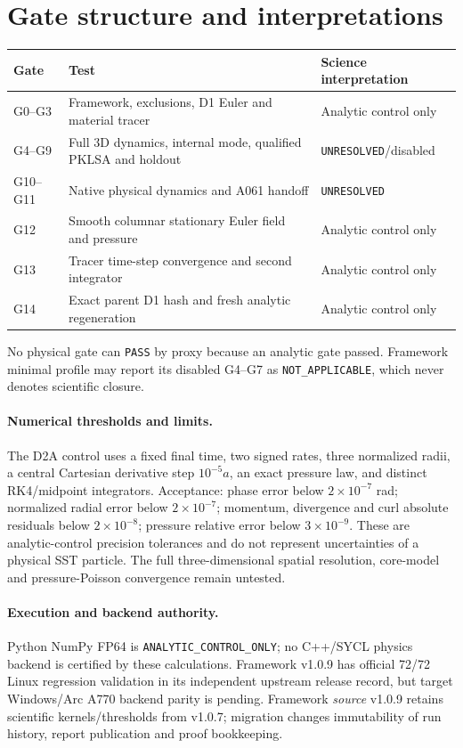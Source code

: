 \documentclass[10pt,a4paper]{article}
\newcommand{\unresolved}{\texttt{UNRESOLVED}}
\begin{document}
\section{Gate structure and interpretations}
\begin{longtable}{p{.10\linewidth}p{.66\linewidth}p{.17\linewidth}}
\toprule Gate & Test & Science interpretation\\\midrule
G0--G3 & Framework, exclusions, D1 Euler and material tracer & Analytic control only\\
G4--G9 & Full 3D dynamics, internal mode, qualified PKLSA and holdout & \unresolved/disabled\\
G10--G11 & Native physical dynamics and A061 handoff & \unresolved\\
G12 & Smooth columnar stationary Euler field and pressure & Analytic control only\\
G13 & Tracer time-step convergence and second integrator & Analytic control only\\
G14 & Exact parent D1 hash and fresh analytic regeneration & Analytic control only\\\bottomrule
\end{longtable}
No physical gate can \texttt{PASS} by proxy because an analytic gate passed.
Framework minimal profile may report its disabled G4--G7 as
\texttt{NOT\_APPLICABLE}, which never denotes scientific closure.
\paragraph{Numerical thresholds and limits.}
The D2A control uses a fixed final time, two signed rates, three normalized
radii, a central Cartesian derivative step $10^{-5}a$, an exact pressure law,
and distinct RK4/midpoint integrators. Acceptance: phase error below $2\times10^{-7}$
rad; normalized radial error below $2\times10^{-7}$; momentum, divergence and
curl absolute residuals below $2\times 10^{-8}$; pressure relative error below
$3\times10^{-9}$. These are analytic-control precision tolerances and do not
represent uncertainties of a physical SST particle. The full three-dimensional
spatial resolution, core-model and pressure-Poisson convergence remain untested.
\paragraph{Execution and backend authority.}
Python NumPy FP64 is \texttt{ANALYTIC\_CONTROL\_ONLY}; no C++/SYCL physics
backend is certified by these calculations. Framework v1.0.9 has official
72/72 Linux regression validation in its independent upstream release record,
but target Windows/Arc A770 backend parity is pending. Framework \emph{source}
v1.0.9 retains scientific kernels/thresholds from v1.0.7; migration changes
immutability of run history, report publication and proof bookkeeping.
\end{document}
